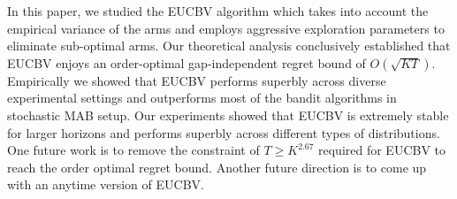 In this paper, we studied the EUCBV algorithm which takes into account the empirical variance of the arms and employs aggressive exploration parameters to eliminate sub-optimal arms. Our theoretical analysis conclusively established that EUCBV enjoys an order-optimal gap-independent regret bound of $O\left(\sqrt{KT}\right)$. Empirically we showed that EUCBV performs superbly across diverse experimental settings and outperforms most of the bandit algorithms in stochastic  MAB setup. Our experiments showed that EUCBV is extremely stable for larger horizons and performs superbly  across different types of distributions. One future work is to remove the constraint of $T\geq K^{2.67}$ required for EUCBV to reach the order optimal regret bound. Another future direction is to come up with an anytime version of EUCBV. 